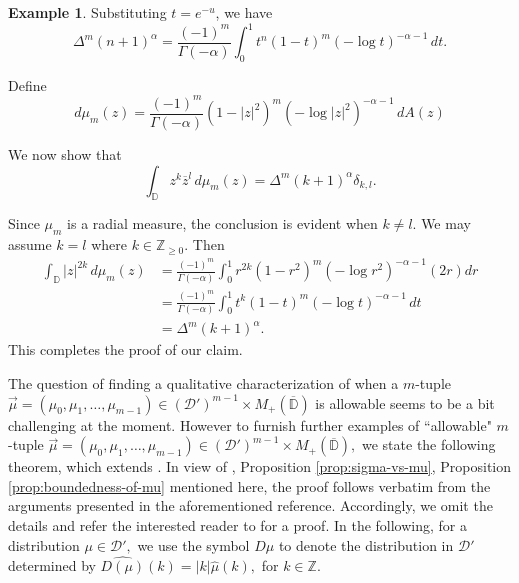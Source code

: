 \documentclass[10pt,oneside,reqno]{amsart}
\theoremstyle{definition}
\newtheorem{example}[theorem]{Example}
\theoremstyle{remark}
\newcommand{\abs}[1]{\left\lvert #1 \right\rvert}
\renewcommand{\ge}{\geqslant}
\newcommand{\Z}{\mathbb Z}
\newcommand{\D}{\mathbb D}
\numberwithin{equation}{section}
\begin{document}
\begin{example}
Substituting $t=e^{-u}$, we have
\begin{equation*}
    \Delta^m (n+1)^{\alpha} = \frac{(-1)^m}{\Gamma(-\alpha)} \int_{0}^{1} t^n (1-t)^m \left( -\log t\right)^{-\alpha -1} \, dt.
\end{equation*}

Define \begin{equation*}
    d\mu_m (z) = \frac{(-1)^m}{\Gamma(-\alpha)} (1-\abs{z}^2)^{m} (-\log |z|^2)^{-\alpha-1} \, dA(z)
\end{equation*}

We now show that
\begin{equation*}
    \int_{\D} z^k \overline{z}^l \, d\mu_m (z) = \Delta^m (k+1)^{\alpha} \delta_{k,l}.
\end{equation*}

Since $\mu_m$ is a radial measure, the conclusion is evident when $k \ne l$. We may assume $k=l$ where $k\in \Z_{\ge 0}$. Then 
\begin{align*}
    \int_{\D} \abs{z}^{2k} \, d\mu_m (z) &= \frac{(-1)^m}{\Gamma(-\alpha)} \int_{0}^{1} r^{2k} (1-r^2)^{m} (-\log r^2 )^{-\alpha -1 } (2r) dr \\
    &= \frac{(-1)^m}{\Gamma(-\alpha)} \int_{0}^{1}t^{k}(1-t)^m (-\log t)^{-\alpha-1}\, dt\\
    &= \Delta^{m}(k+1)^{\alpha}.
\end{align*}
This completes the proof of our claim.
\end{example}

 The question of finding a qualitative characterization of when a $m$-tuple $\overrightarrow{\mu} = \left( \mu_{0}, \mu_{1}, \ldots , \mu_{m-1} \right)\in (\mathcal D')^{m-1}\times M_+(\overline{\D})$ is allowable seems to be a bit challenging at the moment.  However to furnish further examples of ``allowable"  $m$-tuple $\overrightarrow{\mu}= (\mu_0,\mu_1,\ldots,\mu_{m-1})\in (\mathcal D')^{m-1}\times M_+(\overline{\D}),$ we state the following theorem, which extends \cite[Theorem 6.4]{Rydhe19}. In view of \cite[Lemma 5.8]{Rydhe19},  Proposition \ref{prop:sigma-vs-mu}, Proposition \ref{prop:boundedness-of-mu} mentioned here, the proof follows verbatim from the arguments presented in the aforementioned reference. Accordingly, we omit the details and refer the interested reader to \cite[Theorem 6.4]{Rydhe19} for a proof. In the following, for a distribution $\mu\in \mathcal D',$ we use the symbol $D\mu$ to denote the distribution in $\mathcal D'$ determined by $\widehat{D(\mu)}(k)= |k| \hat{\mu}(k),$ for $k\in \mathbb Z.$ 
\end{document}
